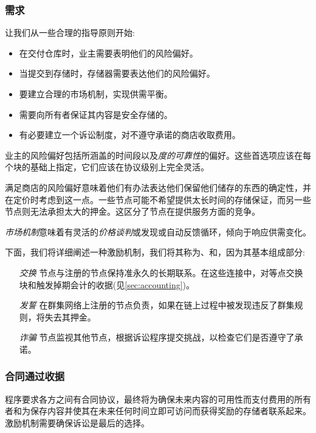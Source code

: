 \subsubsection{需求}

让我们从一些合理的指导原则开始:

\begin{itemize}
\item 在交付仓库时，业主需要表明他们的风险偏好。
\item 当提交到存储时，存储器需要表达他们的风险偏好。
\item 要建立合理的市场机制，实现供需平衡。
\item 需要向所有者保证其内容是安全存储的。
\item 有必要建立一个诉讼制度，对不遵守承诺的商店收取费用。
\end{itemize}

业主的风险偏好包括所涵盖的时间段以及\emph{度的可靠性}的偏好。这些首选项应该在每个块的基础上指定，它们应该在协议级别上完全灵活。

满足商店的风险偏好意味着他们有办法表达他们保留他们储存的东西的确定性，并在定价时考虑到这一点。一些节点可能不希望提供太长时间的存储保证，而另一些节点则无法承担太大的押金。这区分了节点在提供服务方面的竞争。

\emph{市场机制}意味着有灵活的\emph{价格谈判}或发现或自动反馈循环，倾向于响应供需变化。

下面，我们将详细阐述一种激励机制，我们将其称为、和，因为其基本组成部分:

\begin{itemize}
\item[\emph{交换}]
  节点与注册的节点保持准永久的长期联系。在这些连接中，对等点交换块和触发掉期会计的收据(见\ref{sec:accounting})。
  
\item[\emph{发誓}]
  在群集网络上注册的节点负责，如果在链上过程中被发现违反了群集规则，将失去其押金。

\item[\emph{诈骗}]
  节点监视其他节点，根据诉讼程序提交挑战，以检查它们是否遵守了承诺。

\end{itemize}

\subsubsection{合同通过收据}

程序要求各方之间有合同协议，最终将为确保未来内容的可用性而支付费用的所有者和为保存内容并使其在未来任何时间立即可访问而获得奖励的存储者联系起来。激励机制需要确保诉讼是最后的选择。

